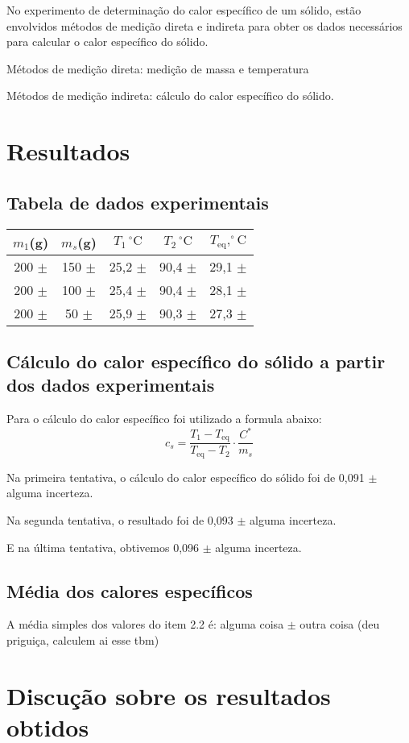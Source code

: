 \documentclass{article}
\begin{document}
\begin{multicols}{2}
No experimento de determinação do calor específico de um sólido, estão envolvidos métodos de medição direta e indireta para obter os dados necessários para calcular o calor específico do sólido.

Métodos de medição direta: medição de massa e temperatura

Métodos de medição indireta: cálculo do calor específico do sólido.

\section{Resultados}
\subsection{Tabela de dados experimentais}

\begin{minipage}{\linewidth}
\centering
\begin{tabular}{|c|c|c|c|c|}
    \hline
    $m_1$(g) & $m_s$(g) & $T_1\,^{\circ}\mathrm{C}$    & $T_2\,^{\circ}\mathrm{C}$ &$T_{\text{eq}},^{\circ}\mathrm{C}$ \\
    \hline
    200 $\pm$ & 150 $\pm$   & 25,2 $\pm$  & 90,4 $\pm$  & 29,1 $\pm$   \\
    \hline
    200 $\pm$  & 100 $\pm$  & 25,4 $\pm$  & 90,4 $\pm$  & 28,1 $\pm$   \\
    \hline
    200 $\pm$ & 50 $\pm$   & 25,9 $\pm$  & 90,3 $\pm$  & 27,3 $\pm$    \\
    \hline
\end{tabular}
\end{minipage}

\subsection{Cálculo do calor específico do sólido a partir dos dados experimentais}
Para o cálculo do calor específico foi utilizado a formula abaixo:
\begin{equation}
    c_s = \frac{{T_1 - T_{\text{eq}}}}{{T_{\text{eq}} - T_2}} \cdot \frac{C^*}{m_s}
    \end{equation}
    
Na primeira tentativa, o cálculo do calor específico do sólido foi de 0,091 $\pm$ alguma incerteza.

Na segunda tentativa, o resultado foi de 0,093 $\pm$ alguma incerteza.

E na última tentativa, obtivemos 0,096 $\pm$ alguma incerteza.

\subsection{Média dos calores específicos}

A média simples dos valores do item 2.2 é: alguma coisa $\pm$ outra coisa (deu priguiça, calculem ai esse tbm)

\section{Discução sobre os resultados obtidos}

\end{multicols}
\end{document}
